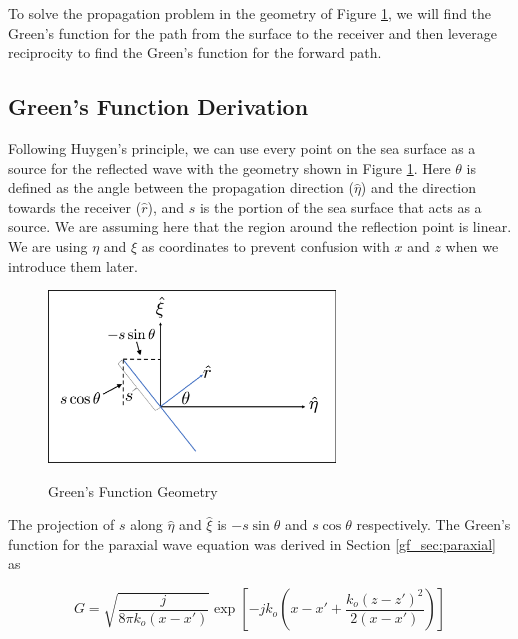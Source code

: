 To solve the propagation problem in the geometry of Figure \ref{mp_fig:2a}, we will find the Green's function for the path from the surface to the receiver and then leverage reciprocity to find the Green's function for the forward path.

\subsection{Green's Function Derivation}
Following Huygen's principle, we can use every point on the sea surface as a source for the reflected wave with the geometry shown in Figure \ref{mp_fig:2a}. Here $\theta$ is defined as the angle between the propagation direction ($\hat{\eta}$) and the direction towards the receiver ($\hat{r}$), and $s$ is the portion of the sea surface that acts as a source. We are assuming here that the region around the reflection point is linear. We are using $\eta$ and $\xi$ as coordinates to prevent confusion with $x$ and $z$ when we introduce them later.

\begin{figure}[H]
  \begin{center}
\includegraphics[width=3in]{../media/analysis/gf_geometry.png}
  \end{center}
  \renewcommand{\baselinestretch}{1} \small\normalsize
  \begin{quote}
    \caption[Green's Function Geometry ]{Green's Function Geometry\label{mp_fig:2a}}
  \end{quote}
\end{figure}
\renewcommand{\baselinestretch}{2} \small\normalsize

The projection of $s$ along $\hat{\eta}$ and $\hat{\xi}$ is $-s\sin\theta$ and $s\cos\theta$ respectively. The Green's function for the paraxial wave equation was derived in Section \ref{gf_sec:paraxial} as

\begin{equation}
G= \sqrt{\frac{j}{8\pi k_o(x-x')}}\exp\left[-jk_o\left(x -x' + \frac{k_o(z-z')^2}{2(x-x')}\right) \right]
\label{mp_eq:11aa}
\end{equation}

